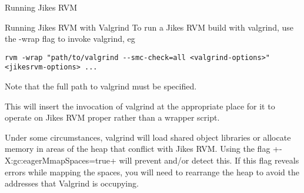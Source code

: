 \begin{chapter}{Running Jikes RVM}
\begin{section}{Running Jikes RVM with Valgrind}
To run a Jikes RVM build with valgrind, use the -wrap flag to invoke valgrind, eg
\begin{lstlisting}
rvm -wrap "path/to/valgrind --smc-check=all <valgrind-options>" <jikesrvm-options> ...
\end{lstlisting}

Note that the full path to valgrind must be specified.

This will insert the invocation of valgrind at the appropriate place for it to operate on Jikes RVM proper rather than a wrapper script. 

Under some circumstances, valgrind will load shared object libraries or allocate memory in areas of the heap that conflict with Jikes RVM.  Using the flag \spverb+-X:gc:eagerMmapSpaces=true+ will prevent and/or detect this.  If this flag reveals errors while mapping the spaces, you will need to rearrange the heap to avoid the addresses that Valgrind is occupying.

\end{section}

\end{chapter}
